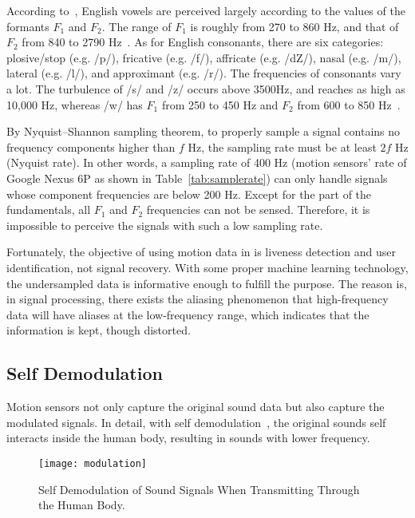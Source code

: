 According to~\cite{ladefoged2014course}, English vowels are perceived largely according to the values of the formants $F_1$ and $F_2$. The range of $F_1$ is roughly from 270 to 860 Hz, and that of $F_2$ from 840 to 2790 Hz~\cite{peterson1952control}. As for English consonants, there are six categories: plosive/stop (e.g. /p/), fricative (e.g. /f/), affricate (e.g. /dZ/), nasal (e.g. /m/), lateral (e.g. /l/), and approximant (e.g. /r/). The frequencies of consonants vary a lot. The turbulence of /s/ and /z/ occurs above 3500Hz, and reaches as high as 10,000 Hz, whereas /w/ has $F_1$ from 250 to 450 Hz and $F_2 $ from 600 to 850 Hz~\cite{ladefoged2012vowels}. 



By Nyquist–Shannon sampling theorem, to properly sample a signal contains no frequency components higher than $f$ Hz, the sampling rate must be at least $2f$ Hz (Nyquist rate). In other words, a sampling rate of 400 Hz (motion sensors' rate of Google Nexus 6P as shown in Table~\ref{tab:samplerate}) can only handle signals whose component frequencies are below 200 Hz. Except for the part of the fundamentals, all $F_1$ and $F_2$ frequencies can not be sensed. Therefore, it is impossible to perceive the signals with such a low sampling rate.

Fortunately, the objective of using motion data in {\shortname} is liveness detection and user identification, not signal recovery. With some proper machine learning technology, the undersampled data is informative enough to fulfill the purpose. The reason is, in signal processing, there exists the aliasing phenomenon that high-frequency data will have aliases at the low-frequency range, which indicates that the information is kept, though distorted.



\subsection{Self Demodulation}
Motion sensors not only capture the original sound data but also capture the modulated signals. In detail, with self demodulation~\cite{berktay1965possible}, the original sounds self interacts inside the human body, resulting in sounds with lower frequency.

\begin{figure}[h]
	\centering
		\texttt{[image: modulation]}
	\caption{Self Demodulation of Sound Signals When Transmitting Through the Human Body.}
	\label{fig:modulation}
\end{figure}

